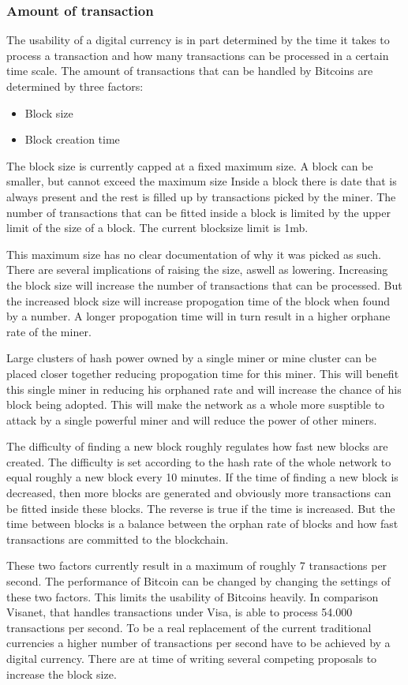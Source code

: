 \subsubsection{Amount of transaction}
The usability of a digital currency is in part determined by the time it takes to process a transaction
and how many transactions can be processed in a certain time scale.
The amount of transactions that can be handled by Bitcoins are determined by three factors:
\begin{itemize}
\item Block size
\item Block creation time
\end{itemize}

The block size is currently capped at a fixed maximum size.
A block can be smaller, but cannot exceed the maximum size
Inside a block there is date that is always present and the rest is filled up by transactions picked by the miner.
The number of transactions that can be fitted inside a block is limited by the upper limit of the size of a block.
The current blocksize limit is 1mb.

This maximum size has no clear documentation of why it was picked as such.
There are several implications of raising the size, aswell as lowering.
Increasing the block size will increase the number of transactions that can be processed.
But the increased block size will increase propogation time of the block when found by a number.
A longer propogation time will in turn result in a higher orphane rate of the miner.

Large clusters of hash power owned by a single miner or mine cluster can be placed closer together
reducing propogation time for this miner.
This will benefit this single miner in reducing his orphaned rate
and will increase the chance of his block being adopted.
This will make the network as a whole more susptible to attack by a single powerful miner
and will reduce the power of other miners.

The difficulty of finding a new block roughly regulates how fast new blocks are created.
The difficulty is set according to the hash rate of the whole network to equal roughly a new block every 10 minutes.
If the time of finding a new block is decreased,
then more blocks are generated and obviously more transactions can be fitted inside these blocks.
The reverse is true if the time is increased.
But the time between blocks is a balance between the orphan rate of blocks
and how fast transactions are committed to the blockchain.

These two factors currently result in a maximum of roughly 7 transactions per second.
The performance of Bitcoin can be changed by changing the settings of these two factors.
This limits the usability of Bitcoins heavily.
In comparison Visanet, that handles transactions under Visa, is able to process 54.000 transactions per second.
To be a real replacement of the current traditional currencies
a higher number of transactions per second have to be achieved by a digital currency.
There are at time of writing several competing proposals to increase the block size\cite{garzik-blocksize}\cite{andresen-blocksize}.